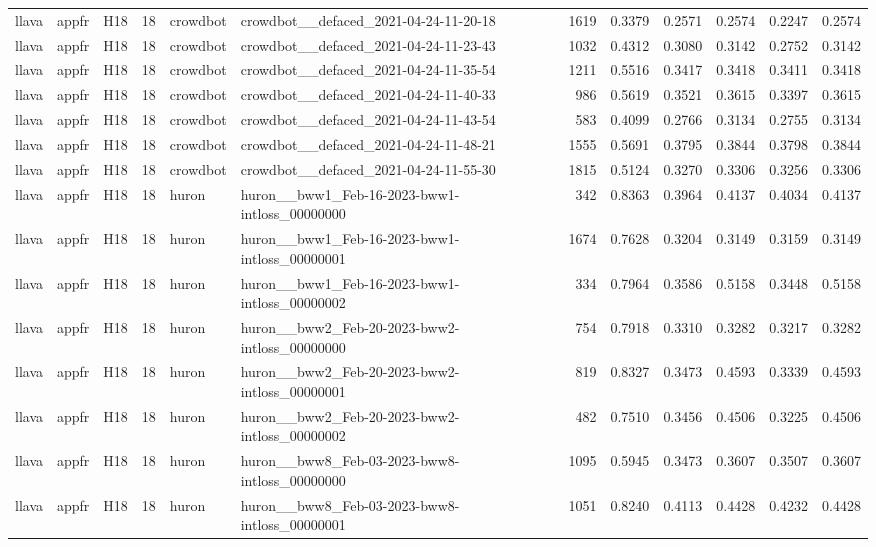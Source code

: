 \begin{table}[tbp]
\begin{tabular}{lllrllrrrrrr}
llava & appfr & H18 & 18 & crowdbot & crowdbot\_\_defaced\_2021-04-24-11-20-18 & 1619 & 0.3379 & 0.2571 & 0.2574 & 0.2247 & 0.2574 \\
llava & appfr & H18 & 18 & crowdbot & crowdbot\_\_defaced\_2021-04-24-11-23-43 & 1032 & 0.4312 & 0.3080 & 0.3142 & 0.2752 & 0.3142 \\
llava & appfr & H18 & 18 & crowdbot & crowdbot\_\_defaced\_2021-04-24-11-35-54 & 1211 & 0.5516 & 0.3417 & 0.3418 & 0.3411 & 0.3418 \\
llava & appfr & H18 & 18 & crowdbot & crowdbot\_\_defaced\_2021-04-24-11-40-33 & 986 & 0.5619 & 0.3521 & 0.3615 & 0.3397 & 0.3615 \\
llava & appfr & H18 & 18 & crowdbot & crowdbot\_\_defaced\_2021-04-24-11-43-54 & 583 & 0.4099 & 0.2766 & 0.3134 & 0.2755 & 0.3134 \\
llava & appfr & H18 & 18 & crowdbot & crowdbot\_\_defaced\_2021-04-24-11-48-21 & 1555 & 0.5691 & 0.3795 & 0.3844 & 0.3798 & 0.3844 \\
llava & appfr & H18 & 18 & crowdbot & crowdbot\_\_defaced\_2021-04-24-11-55-30 & 1815 & 0.5124 & 0.3270 & 0.3306 & 0.3256 & 0.3306 \\
llava & appfr & H18 & 18 & huron & huron\_\_bww1\_Feb-16-2023-bww1-intloss\_00000000 & 342 & 0.8363 & 0.3964 & 0.4137 & 0.4034 & 0.4137 \\
llava & appfr & H18 & 18 & huron & huron\_\_bww1\_Feb-16-2023-bww1-intloss\_00000001 & 1674 & 0.7628 & 0.3204 & 0.3149 & 0.3159 & 0.3149 \\
llava & appfr & H18 & 18 & huron & huron\_\_bww1\_Feb-16-2023-bww1-intloss\_00000002 & 334 & 0.7964 & 0.3586 & 0.5158 & 0.3448 & 0.5158 \\
llava & appfr & H18 & 18 & huron & huron\_\_bww2\_Feb-20-2023-bww2-intloss\_00000000 & 754 & 0.7918 & 0.3310 & 0.3282 & 0.3217 & 0.3282 \\
llava & appfr & H18 & 18 & huron & huron\_\_bww2\_Feb-20-2023-bww2-intloss\_00000001 & 819 & 0.8327 & 0.3473 & 0.4593 & 0.3339 & 0.4593 \\
llava & appfr & H18 & 18 & huron & huron\_\_bww2\_Feb-20-2023-bww2-intloss\_00000002 & 482 & 0.7510 & 0.3456 & 0.4506 & 0.3225 & 0.4506 \\
llava & appfr & H18 & 18 & huron & huron\_\_bww8\_Feb-03-2023-bww8-intloss\_00000000 & 1095 & 0.5945 & 0.3473 & 0.3607 & 0.3507 & 0.3607 \\
llava & appfr & H18 & 18 & huron & huron\_\_bww8\_Feb-03-2023-bww8-intloss\_00000001 & 1051 & 0.8240 & 0.4113 & 0.4428 & 0.4232 & 0.4428 \\

\end{tabular}
\end{table}
